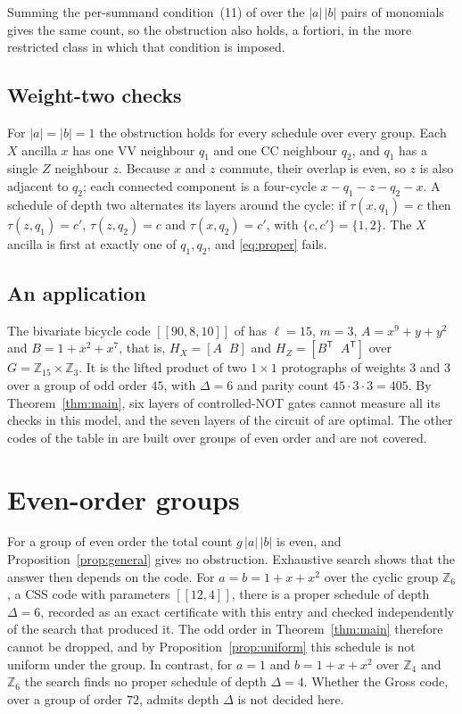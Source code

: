 \documentclass[11pt,a4paper]{article}
\theoremstyle{definition}
\theoremstyle{plain}
\newcommand{\VV}{\mathrm{VV}}
\newcommand{\CC}{\mathrm{CC}}
\begin{document}
Summing the per-summand condition~(11) of \cite{NRB2026} over the
$\lvert a\rvert\,\lvert b\rvert$ pairs of monomials gives the same count, so the
obstruction also holds, a fortiori, in the more restricted class in which
that condition is imposed.

\subsection{Weight-two checks}
For $\lvert a\rvert=\lvert b\rvert=1$ the obstruction holds for every schedule
over every group. Each $X$ ancilla $x$ has one $\VV$ neighbour $q_1$ and one
$\CC$ neighbour $q_2$, and $q_1$ has a single $Z$ neighbour $z$. Because $x$
and $z$ commute, their overlap is even, so $z$ is also adjacent to $q_2$; each
connected component is a four-cycle $x-q_1-z-q_2-x$. A schedule of depth two
alternates its layers around the cycle: if $\tau(x,q_1)=c$ then
$\tau(z,q_1)=c'$, $\tau(z,q_2)=c$ and $\tau(x,q_2)=c'$, with $\{c,c'\}=\{1,2\}$.
The $X$ ancilla is first at exactly one of $q_1,q_2$, and \eqref{eq:proper}
fails.

\subsection{An application}
The bivariate bicycle code $[[90,8,10]]$ of \cite{Bravyi2024} has $\ell=15$,
$m=3$, $A=x^9+y+y^2$ and $B=1+x^2+x^7$, that is, $H_X=[A\;\;B]$ and
$H_Z=[B^{\mathsf T}\;\;A^{\mathsf T}]$ over $G=\mathbb{Z}_{15}\times\mathbb{Z}_3$.
It is the lifted product of two $1\times1$ protographs of weights $3$ and $3$
over a group of odd order $45$, with $\Delta=6$ and parity count
$45\cdot3\cdot3=405$. By Theorem~\ref{thm:main}, six layers of controlled-NOT
gates cannot measure all its checks in this model, and the seven layers of
the circuit of \cite{Bravyi2024} are optimal. The other codes of the table in
\cite{Bravyi2024} are built over groups of even order and are not covered.

\section{Even-order groups}\label{sec:even}
For a group of even order the total count $g\,\lvert a\rvert\,\lvert b\rvert$ is
even, and Proposition~\ref{prop:general} gives no obstruction. Exhaustive
search shows that the answer then depends on the code. For
$a=b=1+x+x^2$ over the cyclic group $\mathbb{Z}_6$, a CSS code with parameters
$[[12,4]]$, there is a proper schedule of depth $\Delta=6$, recorded as an
exact certificate with this entry and checked independently of the search
that produced it. The odd order in Theorem~\ref{thm:main} therefore cannot be
dropped, and by Proposition~\ref{prop:uniform} this schedule is not uniform
under the group. In contrast, for $a=1$ and $b=1+x+x^2$ over $\mathbb{Z}_4$ and
$\mathbb{Z}_6$ the search finds no proper schedule of depth $\Delta=4$. Whether
the Gross code, over a group of order $72$, admits depth $\Delta$ is not
decided here.
\end{document}
